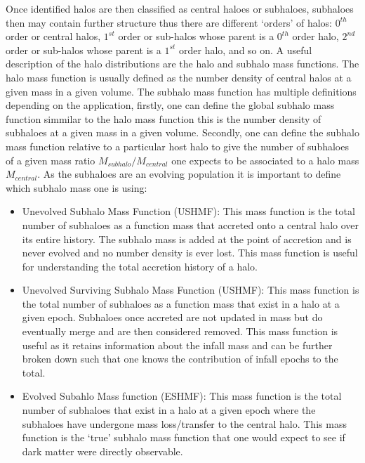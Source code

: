 Once identified halos are then classified as central haloes or subhaloes, subhaloes then may contain further structure thus there are different `orders' of halos: $0^{th}$ order or central halos, $1^{st}$ order or sub-halos whose parent is a $0^{th}$ order halo, $2^{nd}$ order or sub-halos whose parent is a $1^{st}$ order halo, and so on. A useful description of the halo distributions are the halo and subhalo mass functions. The halo mass function is usually defined as the number density of central halos at a given mass in a given volume. The subhalo mass function has multiple definitions depending on the application, firstly, one can define the global subhalo mass function simmilar to the halo mass function this is the number density of subhaloes at a given mass in a given volume. Secondly, one can define the subhalo mass function relative to a particular host halo to give the number of subhaloes of a given mass ratio $M_{subhalo}/M_{central}$ one expects to be associated to a halo mass $M_{central}$. As the subhaloes are an evolving population it is important to define which subhalo mass one is using:

\begin{itemize}
    \item Unevolved Subhalo Mass Function (USHMF): This mass function is the total number of subhaloes as a function mass that accreted onto a central halo over its entire history. The subhalo mass is added at the point of accretion and is never evolved and no number density is ever lost. This mass function is useful for understanding the total accretion history of a halo.
    \item Unevolved Surviving Subhalo Mass Function (USHMF): This mass function is the total number of subhaloes as a function mass that exist in a halo at a given epoch. Subhaloes once accreted are not updated in mass but do eventually merge and are then considered removed. This mass function is useful as it retains information about the infall mass and can be further broken down such that one knows the contribution of infall epochs to the total.
    \item Evolved Subahlo Mass function (ESHMF): This mass function is the total number of subhaloes that exist in a halo at a given epoch where the subhaloes have undergone mass loss/transfer to the central halo. This mass function is the `true' subhalo mass function that one would expect to see if dark matter were directly observable.
\end{itemize}


